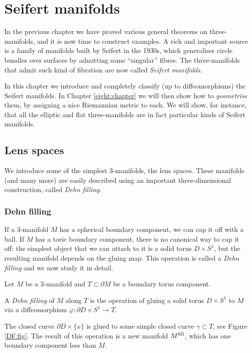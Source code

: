 \chapter{Seifert manifolds} \label{Seifert:chapter}

In the previous chapter we have proved various general theorems on three-manifolds, and it is now time to construct examples. A rich and important source is a family of manifolds built by Seifert in the 1930s, which generalises circle bundles over surfaces by admitting some ``singular'' fibres. The three-manifolds that admit such kind of fibration are now called \emph{Seifert manifolds}. 

In this chapter we introduce and completely classify (up to diffeomorphisms) the Seifert manifolds. In Chapter \ref{eight:chapter} we will then show how to \emph{geometrise} them, by assigning a nice Riemannian metric to each. We will show, for instance, that all the elliptic and flat three-manifolds are in fact particular kinds of Seifert manifolds.

\section{Lens spaces}
We introduce some of the simplest 3-manifolds, the lens spaces. These manifolds (and many more) are easily described using an important three-dimensional construction, called \emph{Dehn filling}.

\subsection{Dehn filling} \label{Dehn:filling:subsection}
If a 3-manifold $M$ has a spherical boundary component, we can cap it off with a ball. If $M$ has a toric boundary component, there is no canonical way to cap it off: the simplest object that we can attach to it is a solid torus $D\times S^1$, but the resulting manifold depends on the gluing map. This operation is called a \emph{Dehn filling} and we now study it in detail.

Let $M$ be a 3-manifold and $T\subset \partial M$ be a boundary torus component. 
\begin{defn}
A \emph{Dehn filling} of $M$ along $T$ is the operation of gluing a solid torus $D\times S^1$ to $M$ via a diffeomorphism $\varphi\colon \partial D\times S^1 \to T$. 
\end{defn}

The closed curve $\partial D \times \{x\}$ is glued to some simple closed curve $\gamma\subset T$, see Figure \ref{DF:fig}. The result of this operation is a new manifold $M^{\rm fill}$, which has one boundary component less than $M$.

